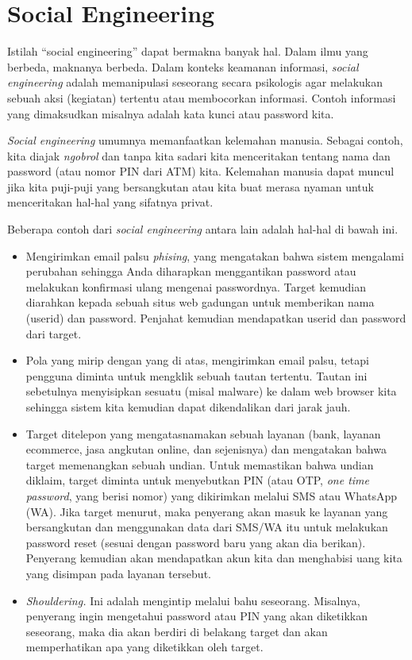 \chapter{Social Engineering}
Istilah ``social engineering'' dapat bermakna banyak hal. 
Dalam ilmu yang berbeda, maknanya berbeda.
Dalam konteks keamanan informasi, {\em social engineering} adalah
memanipulasi seseorang secara psikologis agar melakukan sebuah aksi
(kegiatan) tertentu atau membocorkan informasi.
Contoh informasi yang dimaksudkan misalnya adalah kata kunci atau
password kita.

{\em Social engineering} umumnya memanfaatkan kelemahan manusia.
Sebagai contoh, kita diajak {\em ngobrol} dan tanpa kita sadari
kita menceritakan tentang nama dan password (atau nomor PIN dari ATM) kita.
Kelemahan manusia dapat muncul jika kita puji-puji yang bersangkutan
atau kita buat merasa nyaman untuk menceritakan hal-hal yang sifatnya privat.


Beberapa contoh dari {\em social engineering} antara lain adalah
hal-hal di bawah ini.

\begin{itemize}
    \item Mengirimkan email palsu {\em phising}, yang mengatakan bahwa
    sistem mengalami perubahan sehingga Anda diharapkan menggantikan
    password atau melakukan konfirmasi ulang mengenai passwordnya.
    Target kemudian diarahkan kepada sebuah situs web gadungan
    untuk memberikan nama (userid) dan password. Penjahat kemudian
    mendapatkan userid dan password dari target.
    \item Pola yang mirip dengan yang di atas, mengirimkan email palsu,
    tetapi pengguna diminta untuk mengklik sebuah tautan tertentu.
    Tautan ini sebetulnya menyisipkan sesuatu (misal malware) ke dalam
    web browser kita sehingga sistem kita kemudian dapat dikendalikan dari
    jarak jauh.
    \item Target ditelepon yang mengatasnamakan sebuah layanan
    (bank, layanan ecommerce, jasa angkutan online, dan sejenisnya)
    dan mengatakan bahwa target memenangkan sebuah undian.
    Untuk memastikan bahwa undian diklaim, target diminta untuk 
    menyebutkan PIN (atau OTP, {\em one time password}, yang berisi nomor)
    yang dikirimkan melalui SMS atau WhatsApp (WA). 
    Jika target menurut, maka penyerang akan masuk ke layanan yang bersangkutan 
    dan menggunakan data dari SMS/WA itu untuk melakukan password reset
    (sesuai dengan password baru yang akan dia berikan).
    Penyerang kemudian akan mendapatkan akun kita dan menghabisi
    uang kita yang disimpan pada layanan tersebut.
    \item {\em Shouldering.} Ini adalah mengintip melalui bahu
    seseorang. Misalnya, penyerang ingin mengetahui password atau
    PIN yang akan diketikkan seseorang, maka dia akan berdiri di
    belakang target dan akan memperhatikan apa yang diketikkan oleh
    target.
\end{itemize}

